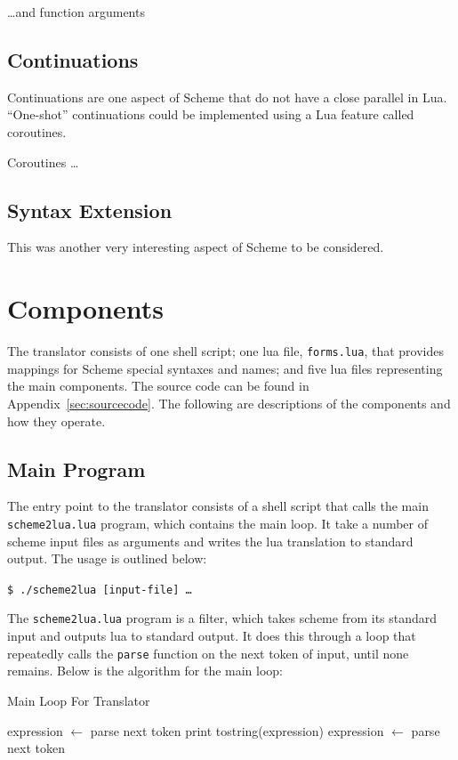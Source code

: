 \ldots and function arguments

\subsection{Continuations}

Continuations are one aspect of Scheme that do not have a close parallel in
Lua. ``One-shot'' continuations could be implemented using a Lua feature called
coroutines.

Coroutines \ldots

\subsection{Syntax Extension}

This was another very interesting aspect of Scheme to be considered. 


\section{Components}

The translator consists of one shell script; one lua file, \texttt{forms.lua},
that provides mappings for Scheme special syntaxes and names; and five lua files
representing the main components. The source code can be found in
Appendix~\ref{sec:sourcecode}. The following are descriptions of the components
and how they operate.

\subsection{Main Program}

The entry point to the translator consists of a shell script that calls the main
\texttt{scheme2lua.lua} program, which contains the main loop. It take a number
of scheme input files as arguments and writes the lua translation to standard
output. The usage is outlined below:

\begin{framed}
\texttt{\$ ./scheme2lua [input-file] \ldots}
\end{framed}

The \texttt{scheme2lua.lua} program is a filter, which takes scheme from its
standard input and outputs lua to standard output. It does this through a loop
that repeatedly calls the \texttt{parse} function on the next token of input,
until none remains. Below is the algorithm for the main loop:

\begin{algorithm}
\caption{Main Loop For Translator}
\label{alg:mainloop}
\begin{algorithmic}
\STATE expression $\leftarrow$ parse next token  
\STATE print tostring(expression)
\STATE expression $\leftarrow$ parse next token
\ENDWHILE
\end{algorithmic}
\end{algorithm}

